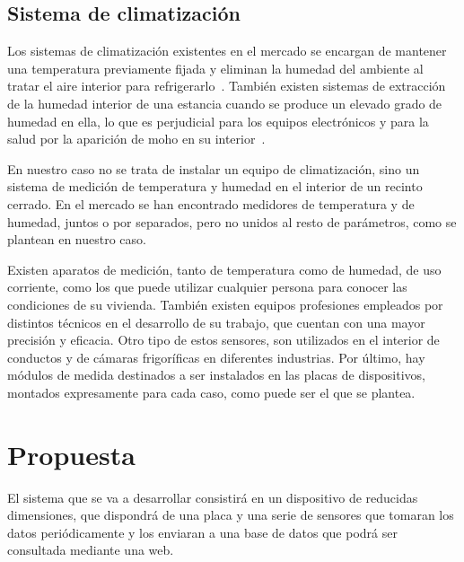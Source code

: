 \subsection{Sistema de climatización}\label{subsec:sistema-de-climatización}
Los sistemas de climatización existentes en el mercado se encargan de mantener una temperatura previamente fijada y eliminan la humedad del ambiente al tratar el aire interior para refrigerarlo~\cite{ruiz_sistemas_nodate}. También existen sistemas de extracción de la humedad interior de una estancia cuando se produce un elevado grado de humedad en ella, lo que es perjudicial para los equipos electrónicos y para la salud por la aparición de moho en su interior~\cite{murprotec_calidad_nodate}.

En nuestro caso no se trata de instalar un equipo de climatización, sino un sistema de medición de temperatura y humedad en el interior de un recinto cerrado. En el mercado se han encontrado medidores de temperatura y de humedad, juntos o por separados, pero no unidos al resto de parámetros, como se plantean en nuestro caso.

Existen aparatos de medición, tanto de temperatura como de humedad, de uso corriente, como los que puede utilizar cualquier persona para conocer las condiciones de su vivienda. También existen equipos profesiones empleados por distintos técnicos en el desarrollo de su trabajo, que cuentan con una mayor precisión y eficacia. Otro tipo de estos sensores, son utilizados en el interior de conductos y de cámaras frigoríficas en diferentes industrias. Por último, hay módulos de medida destinados a ser instalados en las placas de dispositivos, montados expresamente para cada caso, como puede ser el que se plantea.

\section{Propuesta}\label{sec:propuesta}
El sistema que se va a desarrollar consistirá en un dispositivo de reducidas dimensiones, que dispondrá de una placa y una serie de sensores que tomaran los datos periódicamente y los enviaran a una base de datos que podrá ser consultada mediante una web.

